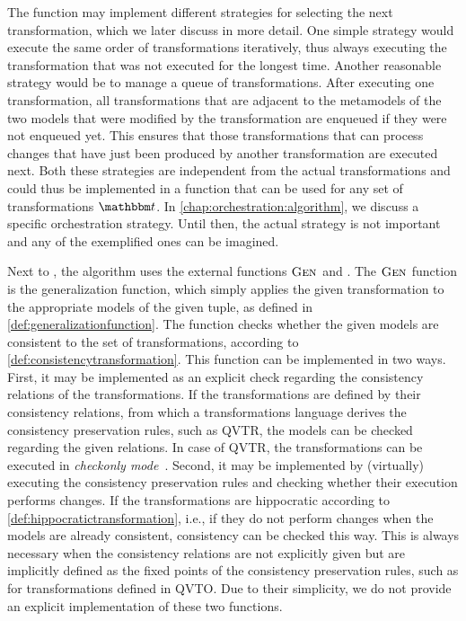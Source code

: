 The  function may implement different strategies for selecting the next transformation, which we later discuss in more detail.
One simple strategy would execute the same order of transformations iteratively, thus always executing the transformation that was not executed for the longest time.
Another reasonable strategy would be to manage a queue of transformations.
After executing one transformation, all transformations that are adjacent to the metamodels of the two models that were modified by the transformation are enqueued if they were not enqueued yet.
This ensures that those transformations that can process changes that have just been produced by another transformation are executed next.
Both these strategies are independent from the actual transformations and could thus be implemented in a function that can be used for any set of transformations $\transformationset{T}$.
In \autoref{chap:orchestration:algorithm}, we discuss a specific orchestration strategy.
Until then, the actual strategy is not important and any of the exemplified ones can be imagined.

Next to , the algorithm uses the external functions $\textsc{Gen}_{}$ and .
The $\textsc{Gen}_{}$ function is the generalization function, which simply applies the given transformation to the appropriate models of the given tuple, as defined in \autoref{def:generalizationfunction}.
The  function checks whether the given models are consistent to the set of transformations, according to \autoref{def:consistencytransformation}.
This function can be implemented in two ways.
First, it may be implemented as an explicit check regarding the consistency relations of the transformations.
If the transformations are defined by their consistency relations, from which a transformations language derives the consistency preservation rules, such as \gls{QVTR}, the models can be checked regarding the given relations.
In case of \gls{QVTR}, the transformations can be executed in \emph{checkonly mode}~\cite[Sec.~7.9]{qvt}.
Second, it may be implemented by (virtually) executing the consistency preservation rules and checking whether their execution performs changes.
If the transformations are hippocratic according to \autoref{def:hippocratictransformation}, i.e., if they do not perform changes when the models are already consistent, consistency can be checked this way.
This is always necessary when the consistency relations are not explicitly given but are implicitly defined as the fixed points of the consistency preservation rules, such as for transformations defined in \gls{QVTO}.
Due to their simplicity, we do not provide an explicit implementation of these two functions.


